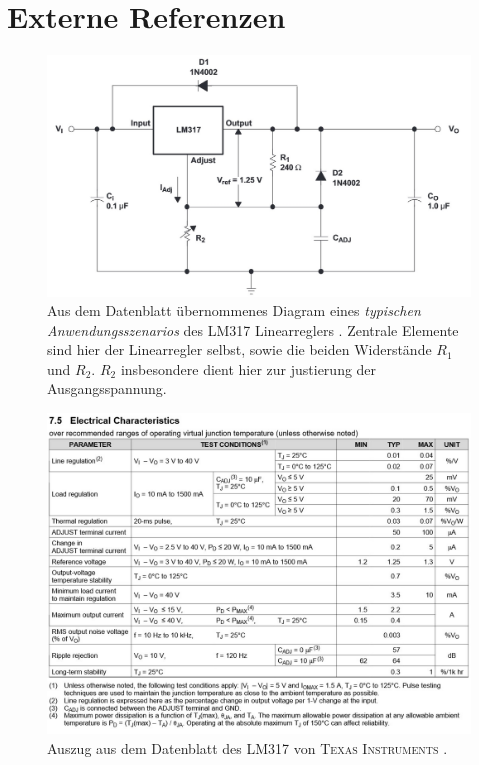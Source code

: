 \chapter{Externe Referenzen}
	\begin{figure}[h]
		\centering
		\includegraphics[width=.9\textwidth]{referenzen/typical_app_schem.jpg}
		\caption[Aus dem Datenblatt übernommenes Diagram eines \textit{typischen Anwendungsszenarios} des LM317]{Aus dem Datenblatt übernommenes Diagram
		eines \textit{typischen Anwendungsszenarios} des LM317 Linearreglers \cite{datasheet.LM317.TexasInstruments.2021}. Zentrale Elemente sind hier der Linearregler selbst, sowie
		die beiden Widerstände \(R_1\) und \(R_2\). \(R_2\) insbesondere dient hier zur justierung der Ausgangsspannung.}
		\label{fig:typical app sch}
	\end{figure}
	\newpage
	\begin{figure}[h]
		\centering
		\includegraphics[width=\textwidth]{referenzen/electrical_characteristics_LM317.jpg}
		\caption[Auszug aus dem Datenblatt des LM317 von \textsc{Texas Instruments}]{Auszug aus dem Datenblatt des LM317 von \textsc{Texas Instruments} \cite{datasheet.LM317.TexasInstruments.2021}.}
		\label{tab:lm317 characteristics}
	\end{figure}
